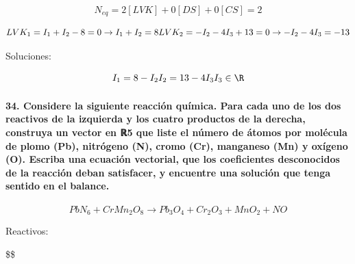 \documentclass[
]{article}
\begin{document}
\[
N_{eq} = 2 [LVK] + 0 [DS] + 0 [CS] = 2
\]

\[
LVK_1 = I_1 + I_2 - 8 = 0 \rightarrow I_1 + I_2 = 8\\
LVK_2 = -I_2 - 4I_3 + 13 = 0 \rightarrow -I_2 - 4I_3 = -13\\
\]

Soluciones:

\[
I_1 = 8 - I_2\\
I_2 = 13 - 4I_3\\
I_3 \in \R
\]

\hypertarget{considere-la-siguiente-reacciuxf3n-quuxedmica.-para-cada-uno-de-los-dos-reactivos-de-la-izquierda-y-los-cuatro-productos-de-la-derecha-construya-un-vector-en-ux211d5-que-liste-el-nuxfamero-de-uxe1tomos-por-moluxe9cula-de-plomo-pb-nitruxf3geno-n-cromo-cr-manganeso-mn-y-oxuxedgeno-o.-escriba-una-ecuaciuxf3n-vectorial-que-los-coeficientes-desconocidos-de-la-reacciuxf3n-deban-satisfacer-y-encuentre-una-soluciuxf3n-que-tenga-sentido-en-el-balance.}{%
\paragraph{34. Considere la siguiente reacción química. Para cada uno de
los dos reactivos de la izquierda y los cuatro productos de la derecha,
construya un vector en ℝ5 que liste el número de átomos por molécula de
plomo (Pb), nitrógeno (N), cromo (Cr), manganeso (Mn) y oxígeno (O).
Escriba una ecuación vectorial, que los coeficientes desconocidos de la
reacción deban satisfacer, y encuentre una solución que tenga sentido en
el
balance.}\label{considere-la-siguiente-reacciuxf3n-quuxedmica.-para-cada-uno-de-los-dos-reactivos-de-la-izquierda-y-los-cuatro-productos-de-la-derecha-construya-un-vector-en-ux211d5-que-liste-el-nuxfamero-de-uxe1tomos-por-moluxe9cula-de-plomo-pb-nitruxf3geno-n-cromo-cr-manganeso-mn-y-oxuxedgeno-o.-escriba-una-ecuaciuxf3n-vectorial-que-los-coeficientes-desconocidos-de-la-reacciuxf3n-deban-satisfacer-y-encuentre-una-soluciuxf3n-que-tenga-sentido-en-el-balance.}}

\[
PbN_6 + CrMn_2O_8 \rightarrow Pb_3O_4 + Cr_2O_3 + MnO_2 + NO
\]

Reactivos:

\$\$
\end{document}
